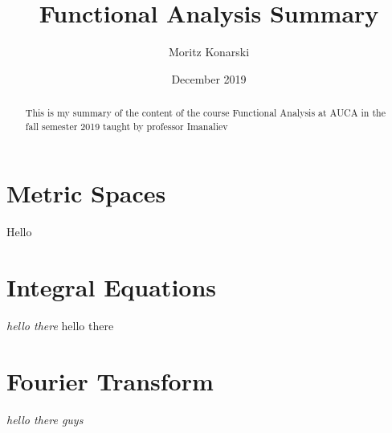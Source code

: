 \documentclass[12pt,a4paper,draft]{article}
\begin{document}
\title{Functional Analysis Summary}
\author{Moritz Konarski}
\date{December 2019}
\maketitle

\renewcommand{\abstractname}{Information}
\begin{abstract}
    This is my summary of the content of the course Functional Analysis at AUCA
    in the fall semester 2019 taught by professor Imanaliev
\end{abstract}

\tableofcontents

\section{Metric Spaces}
Hello

\section{Integral Equations}
{\em hello there} hello there

\section{Fourier Transform}
\emph{hello there guys}
\end{document}
